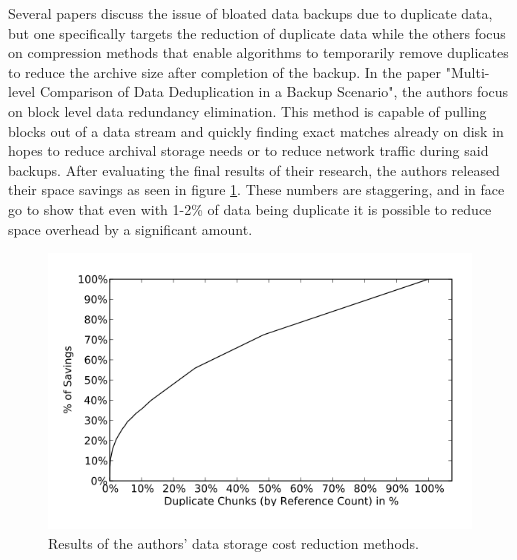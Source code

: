\documentclass[11pt]{article}
\begin{document}
Several papers discuss the issue of bloated data backups due to duplicate data, but one specifically targets the reduction of duplicate data while the others focus on compression methods that enable algorithms to temporarily remove duplicates to reduce the archive size after completion of the backup. In the paper "Multi-level Comparison of Data Deduplication in a Backup Scenario", the authors focus on block level data redundancy elimination. This method is capable of pulling blocks out of a data stream and quickly finding exact matches already on disk in hopes to reduce archival storage needs or to reduce network traffic during said backups. \cite{Meister} After evaluating the final results of their research, the authors released their space savings as seen in figure \ref{fig:save}. These numbers are staggering, and in face go to show that even with 1-2\% of data being duplicate it is possible to reduce space overhead by a significant amount.

\begin{figure}
\begin{center}
\includegraphics[scale=.7]{savings}
\caption{\label{fig:save} Results of the authors' data storage cost reduction methods.}
\end{center}
\end{figure}
\end{document}
